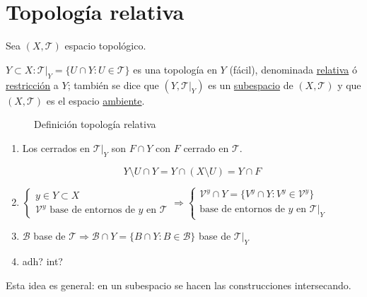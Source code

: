 \section{Topología relativa}%
\label{sec:topologia_relativa}
Sea $\left( X, \mathcal{T} \right)$ espacio topológico.
\begin{defi}
$Y \subset X: \mathcal{T}|_Y = \{U \cap Y: U \in \mathcal{T}\}$ es una topología en $Y$ (fácil), denominada \underline{relativa} ó \underline{restricción} a $Y$; también se dice que $\left( Y, \mathcal{T}|_Y \right)$ es un \underline{subespacio} de $\left( X, \mathcal{T} \right)$ y que $\left( X, \mathcal{T} \right)$ es el espacio \underline{ambiente}. 
\end{defi}
\begin{figure}[H]
    \centering
    \caption{Definición topología relativa}
    \label{fig:definición-topología-relativa}
\end{figure}

\begin{obs}
\begin{enumerate}
    \item Los cerrados en $\mathcal{T}|_Y$ son $F\cap Y$ con $F$ cerrado en $\mathcal{T}$.
    \begin{demo}
    \[
    Y \setminus U \cap Y = Y \cap \left( X \setminus U \right) = Y\cap F
    \]
    \end{demo}
    \item 
    $\begin{cases}
        y \in Y \subset X\\
        \mathcal{V}^y \text{ base de entornos de } y \text{ en } \mathcal{T} 
    \end{cases}\Rightarrow \begin{cases}
        \mathcal{V}^y \cap Y = \{V^y \cap Y : V^y \in \mathcal{V}^y\} \\
        \text{base de entornos de } y \text{ en } \mathcal{T}|_Y 
    \end{cases}$

    \item $\mathcal{B}$ base de $\mathcal{T} \Rightarrow \mathcal{B} \cap Y = \{B \cap Y : B \in \mathcal{B}\}$ base de $\mathcal{T}|_Y$

    \item adh? int?
\end{enumerate}
\end{obs}

Esta idea es general: en un subespacio se hacen las construcciones intersecando.

